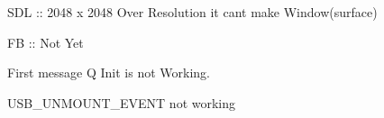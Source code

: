 
\begin{DoxyRefList}
\item[\label{bug__bug000003}%
\Hypertarget{bug__bug000003}%
File \hyperlink{SN__MODULE__IMAGE__VIEWER_8c}{S\+N\+\_\+\+M\+O\+D\+U\+L\+E\+\_\+\+I\+M\+A\+G\+E\+\_\+\+V\+I\+E\+W\+ER.c} ]S\+DL \+:\+: 2048 x 2048 Over Resolution it can\textquotesingle{}t make Window(surface) 

FB \+:\+: Not Yet  
\item[\label{bug__bug000001}%
\Hypertarget{bug__bug000001}%
Member \hyperlink{group__SYSTEM__MESSAGE__Q_ga35e9ff084626dfccd36d098827638a0c}{S\+N\+\_\+\+S\+Y\+S\+\_\+\+Message\+Q\+Init} (sys\+Message\+Q\+Id $\ast$msg\+Q\+Id)]First message Q Init is not Working.  
\item[\label{bug__bug000002}%
\Hypertarget{bug__bug000002}%
File \hyperlink{SN__SYS__USB__DRIVER_8c}{S\+N\+\_\+\+S\+Y\+S\+\_\+\+U\+S\+B\+\_\+\+D\+R\+I\+V\+ER.c} ]U\+S\+B\+\_\+\+U\+N\+M\+O\+U\+N\+T\+\_\+\+E\+V\+E\+NT not working 
\end{DoxyRefList}